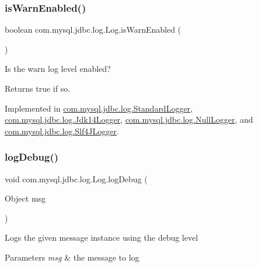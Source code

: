 \subsubsection{\texorpdfstring{is\+Warn\+Enabled()}{isWarnEnabled()}}
{\footnotesize\ttfamily boolean com.\+mysql.\+jdbc.\+log.\+Log.\+is\+Warn\+Enabled (\begin{DoxyParamCaption}{ }\end{DoxyParamCaption})}

Is the \textquotesingle{}warn\textquotesingle{} log level enabled?

\begin{DoxyReturn}{Returns}
true if so. 
\end{DoxyReturn}


Implemented in \mbox{\hyperlink{classcom_1_1mysql_1_1jdbc_1_1log_1_1_standard_logger_ad31d49920ae0271a16aafe7d8d31fc19}{com.\+mysql.\+jdbc.\+log.\+Standard\+Logger}}, \mbox{\hyperlink{classcom_1_1mysql_1_1jdbc_1_1log_1_1_jdk14_logger_a70b246a328418f6a6f380b8f839fdf44}{com.\+mysql.\+jdbc.\+log.\+Jdk14\+Logger}}, \mbox{\hyperlink{classcom_1_1mysql_1_1jdbc_1_1log_1_1_null_logger_aad72483ac79c28b596fdf1a3d4642b9e}{com.\+mysql.\+jdbc.\+log.\+Null\+Logger}}, and \mbox{\hyperlink{classcom_1_1mysql_1_1jdbc_1_1log_1_1_slf4_j_logger_a8b7c1cc5eeb66fcc771c43645fce5802}{com.\+mysql.\+jdbc.\+log.\+Slf4\+J\+Logger}}.

\mbox{\label{interfacecom_1_1mysql_1_1jdbc_1_1log_1_1_log_aa6f1e099156b6a444addba331704c2fe}} 
\subsubsection{\texorpdfstring{log\+Debug()}{logDebug()}\hspace{0.1cm}{\footnotesize\ttfamily [1/2]}}
{\footnotesize\ttfamily void com.\+mysql.\+jdbc.\+log.\+Log.\+log\+Debug (\begin{DoxyParamCaption}\item[{Object}]{msg }\end{DoxyParamCaption})}

Logs the given message instance using the \textquotesingle{}debug\textquotesingle{} level


\begin{DoxyParams}{Parameters}
{\em msg} & the message to log \\
\hline
\end{DoxyParams}


